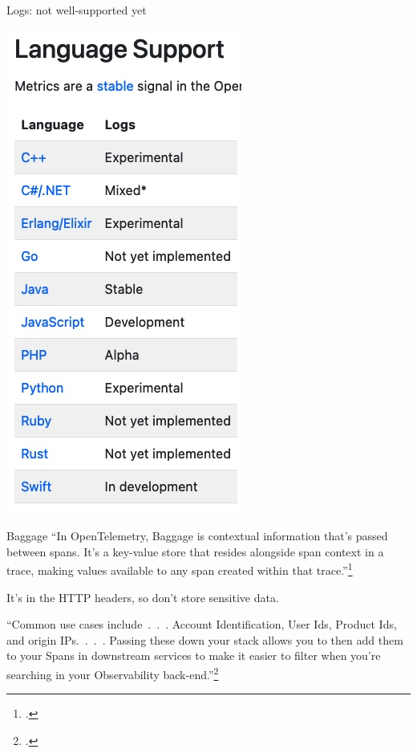\documentclass[aspectratio=169]{beamer}
\begin{document}
\begin{frame}{Logs: not well-supported yet}
  \begin{center}
    \includegraphics[height=0.8\textheight]{logs-support.jpg}
  \end{center}
\end{frame}

\begin{frame}{Baggage}
  ``In OpenTelemetry, Baggage is contextual information that's passed between
  spans. It's a key-value store that resides alongside span context in a trace,
  making values available to any span created within that trace.''\footcite{otel-baggage}

  It's in the HTTP headers, so don't store sensitive data.

  ``Common use cases include~.~.~. Account Identification, User Ids, Product
  Ids, and origin IPs.~.~.~. Passing these down your stack allows you to then
  add them to your Spans in downstream services to make it easier to filter when
  you're searching in your Observability back-end.''\footcite{otel-baggage}
\end{frame}
\end{document}
